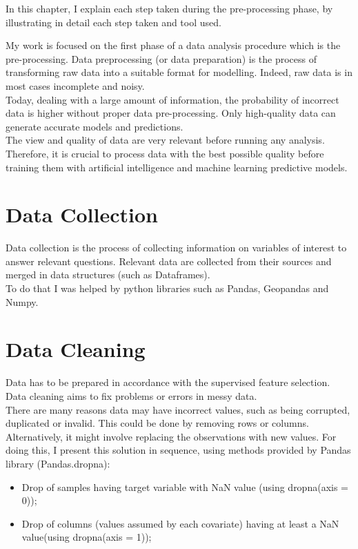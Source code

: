 In this chapter, I explain each step taken during the pre-processing phase, by illustrating in detail each step taken and tool used.
\par
My work is focused on the first phase of a data analysis procedure which is the pre-processing.
Data preprocessing (or data preparation) is the process of transforming raw data into a suitable format for modelling. 
Indeed, raw data is in most cases incomplete and noisy.\\
Today, dealing with a large amount of information, the probability of incorrect data is higher without proper data pre-processing.
Only high-quality data can generate accurate models and predictions. \\
The view and quality of data are very relevant before running any analysis.\\
Therefore, it is crucial to process data with the best possible quality before training them with artificial intelligence and machine learning predictive models.\\
\section{Data Collection}
Data collection is the process of collecting information on variables of interest to answer relevant questions. \newline
Relevant data are collected from their sources and merged in data structures (such as Dataframes). \\
To do that I was helped by python libraries such as Pandas, Geopandas and Numpy.
\section{Data Cleaning}
\label{sec:Data cleaning}
Data has to be prepared in accordance with the supervised feature selection.
Data cleaning aims to fix problems or errors in messy data.\\ There are many reasons data may have incorrect values, such as being corrupted, duplicated or invalid. \newline
This could be done by removing rows or columns. Alternatively, it might involve replacing the observations with new values. \newline
For doing this, I present this solution in sequence, using methods provided by Pandas library (Pandas.dropna):
\begin{itemize}
\item Drop of samples having target variable with NaN value (using dropna(axis = 0));
\item Drop of columns (values assumed by each covariate) having at least a NaN value(using dropna(axis = 1));
\end{itemize}
